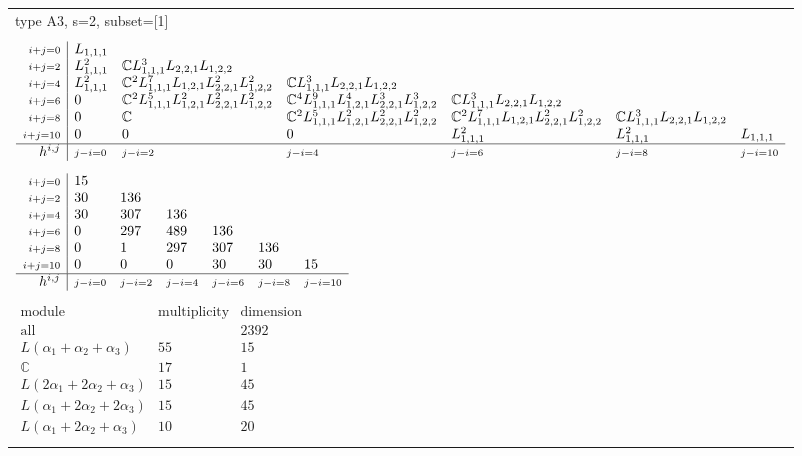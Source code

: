 \documentclass[crop,border=2mm]{standalone}
\begin{document}
\begin{tabular}{l}
{\huge type A3, s=2, subset=[1]}\\ \\


$\displaystyle
\begin{array}{r|l l l l l l}
	{\scriptstyle i+j=0}&L_{1,1,1}&&&&&\\
	{\scriptstyle i+j=2}&L_{1,1,1}^{2}&\mathbb{C}L_{1,1,1}^{3}L_{2,2,1}L_{1,2,2}&&&&\\
	{\scriptstyle i+j=4}&L_{1,1,1}^{2}&\mathbb{C}^{2}L_{1,1,1}^{7}L_{1,2,1}L_{2,2,1}^{2}L_{1,2,2}^{2}&\mathbb{C}L_{1,1,1}^{3}L_{2,2,1}L_{1,2,2}&&&\\
	{\scriptstyle i+j=6}&0&\mathbb{C}^{2}L_{1,1,1}^{5}L_{1,2,1}^{2}L_{2,2,1}^{2}L_{1,2,2}^{2}&\mathbb{C}^{4}L_{1,1,1}^{9}L_{1,2,1}^{4}L_{2,2,1}^{3}L_{1,2,2}^{3}&\mathbb{C}L_{1,1,1}^{3}L_{2,2,1}L_{1,2,2}&&\\
	{\scriptstyle i+j=8}&0&\mathbb{C}&\mathbb{C}^{2}L_{1,1,1}^{5}L_{1,2,1}^{2}L_{2,2,1}^{2}L_{1,2,2}^{2}&\mathbb{C}^{2}L_{1,1,1}^{7}L_{1,2,1}L_{2,2,1}^{2}L_{1,2,2}^{2}&\mathbb{C}L_{1,1,1}^{3}L_{2,2,1}L_{1,2,2}&\\
	{\scriptstyle i+j=10}&0&0&0&L_{1,1,1}^{2}&L_{1,1,1}^{2}&L_{1,1,1}\\
	\hline h^{i,j}&{\scriptstyle j-i=0}&{\scriptstyle j-i=2}&{\scriptstyle j-i=4}&{\scriptstyle j-i=6}&{\scriptstyle j-i=8}&{\scriptstyle j-i=10}
\end{array}
$ \\ \\


$\displaystyle
\begin{array}{r|l l l l l l}
	{\scriptstyle i+j=0}&15&&&&&\\
	{\scriptstyle i+j=2}&30&136&&&&\\
	{\scriptstyle i+j=4}&30&307&136&&&\\
	{\scriptstyle i+j=6}&0&297&489&136&&\\
	{\scriptstyle i+j=8}&0&1&297&307&136&\\
	{\scriptstyle i+j=10}&0&0&0&30&30&15\\
	\hline h^{i,j}&{\scriptstyle j-i=0}&{\scriptstyle j-i=2}&{\scriptstyle j-i=4}&{\scriptstyle j-i=6}&{\scriptstyle j-i=8}&{\scriptstyle j-i=10}
\end{array}
$ \\ \\


$\displaystyle
\begin{array}{rll}
	\text{module}&\text{multiplicity}&\text{dimension} \\ \hline \text{all}&&2392 \\
	L\left(\alpha_{1}+\alpha_{2}+\alpha_{3}\right)&55&15\\
	\mathbb{C}&17&1\\
	L\left( 2\alpha_{1}+ 2\alpha_{2}+\alpha_{3}\right)&15&45\\
	L\left(\alpha_{1}+ 2\alpha_{2}+ 2\alpha_{3}\right)&15&45\\
	L\left(\alpha_{1}+ 2\alpha_{2}+\alpha_{3}\right)&10&20
\end{array}
$ \\ \\

\end{tabular}
\end{document}
